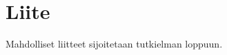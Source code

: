 \documentclass[a4paper,12pt,leqno,oneside]{report} %
\theoremstyle{plain}
\theoremstyle{definition}
\theoremstyle{remark}
\numberwithin{equation}{chapter}
\begin{document}
\chapter*{Liite}

Mahdolliset liitteet sijoitetaan tutkielman loppuun.

%
\end{document}

